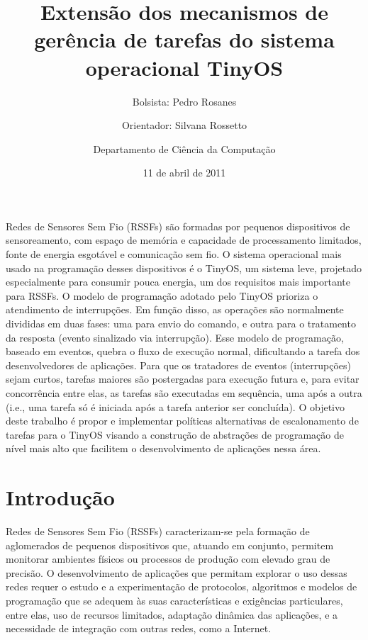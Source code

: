 \documentclass[a4paper, 10pt]{article}
\title{Extensão dos mecanismos de gerência de tarefas do sistema operacional TinyOS}
\author{Bolsista: Pedro Rosanes \and Orientador: Silvana Rossetto \and Departamento de Ciência da Computação}
\date{11 de abril de 2011}
\begin{document}
\begin{titlepage}
\maketitle
\tableofcontents
\end{titlepage}

\label{resumo}
Redes de Sensores Sem Fio (RSSFs) são formadas por pequenos dispositivos de sensoreamento, com 
espaço de memória e capacidade de processamento limitados, fonte de energia esgotável e comunicação sem fio.
O sistema operacional mais usado na programação desses dispositivos é o TinyOS, um sistema leve, 
projetado especialmente para consumir pouca energia, um dos requisitos mais importante para RSSFs. 
O modelo de programação adotado pelo TinyOS prioriza o atendimento de interrupções.
Em função disso, as operações são normalmente divididas em duas fases: uma para envio
do comando, e outra para o tratamento da resposta (evento sinalizado via interrupção). 
Esse modelo de programação, baseado em eventos, quebra o fluxo de execução normal, dificultando a
tarefa dos desenvolvedores de aplicações. 
Para que os tratadores de eventos (interrupções) sejam curtos, tarefas maiores são
postergadas para execução futura e, para evitar concorrência entre elas,
as tarefas são executadas em sequência, uma após a outra (i.e., uma tarefa só é iniciada após a tarefa
anterior ser concluída).  
O objetivo deste trabalho é propor e implementar políticas alternativas de escalonamento de tarefas
para o TinyOS visando a construção de abstrações de programação de nível mais alto que 
facilitem o desenvolvimento de aplicações nessa área.

\section{Introdução}\label{intro}
Redes de Sensores Sem Fio (RSSFs) caracterizam-se pela formação de aglomerados de pequenos 
dispositivos que, atuando em conjunto, permitem monitorar ambientes físicos ou processos de 
produção com elevado grau de precisão. O desenvolvimento de aplicações que permitam explorar 
o uso dessas redes requer o estudo e a experimentação de protocolos, algoritmos e modelos de 
programação que se adequem às suas características e exigências particulares, entre elas, uso
de recursos limitados, adaptação dinâmica das aplicações, e a necessidade de integração com
outras redes, como a Internet.
\end{document}
